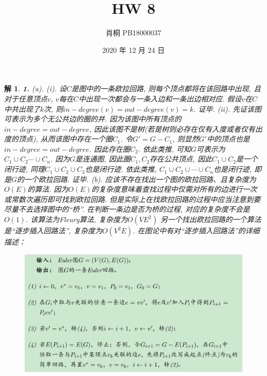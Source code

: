 \documentclass{article}
\begin{document}
	\title{HW 8}
	\author{肖桐 PB18000037}
	\date{2020 年 12 月 24 日}
	\maketitle

	\newtheorem*{solution}{解}

	\begin{solution}\textnormal{\textbf{1.}}
		(a).\newline
		(i). 设$C$是图中的一条欧拉回路, 则每个顶点都将在该回路中出现, 且对于任意顶点$v$, $v$每在$C$中出现一次都会与一条入边和一条出边相对应.
		假设$v$在$C$中共出现了$k$次, 则$in-degree(v) = out-degree(v) = k$. 证毕.\newline
		(ii). 先证该图可表示为多个无公共边的圈的并.\newline
		因为该图中所有顶点的$in-degree = out-degree$, 因此该图不是树(若是树则必存在仅有入度或者仅有出度的顶点), 从而该图中存在一个圈$C_1$.
		令$G' = G - C_1$, 则显然$G'$中的顶点也是$in-degree = out-degree$. 因此存在圈$C_2$.\newline
		依此类推, 可知$G$可表示为$C_1\cup C_2 \cdots \cup C_n$.\newline
		因为$G$是连通图, 因此圈$C_1, C_2$存在公共顶点, 因此$C_1\cup C_2$是一个闭行迹, 同理$C_1\cup C_2\cup C_3$也是闭行迹.
		依此类推, $C_1\cup C_2\cup \cdots \cup C_n$也是闭行迹, 即是$G$的一个欧拉回路. 证毕.\newline
		(b). 应该不存在找出一个图的欧拉回路、且复杂度为$O(E)$的算法. 因为$O(E)$的复杂度意味着查找过程中仅需对所有的边进行一次或常数次遍历即可找到欧拉回路.\newline
		但是实际上在找欧拉回路的过程中应当注意到要尽量不去选择图中的“桥”. 在判断一条边是否为桥的过程, 对应的复杂度不会是$O(1)$. 该算法为Fleury算法, 复杂度为$O(VE^2)$\newline
		另一个找出欧拉回路的一个算法是“逐步插入回路法”, 复杂度为$O(V^2E)$.
		在图论中有对“逐步插入回路法”的详细描述：
		\begin{figure}[h]
			\includegraphics*[scale=0.5]{1.png}
		\end{figure}
	\end{solution}
\end{document}
